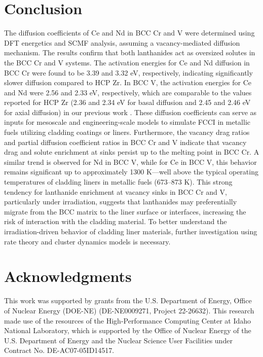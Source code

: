 \documentclass[preprint,12pt]{elsarticle}
\begin{document}
\section{Conclusion}
The diffusion coefficients of Ce and Nd in BCC Cr and V were determined using DFT energetics and SCMF analysis, assuming a vacancy-mediated diffusion mechanism. The results confirm that both lanthanides act as oversized solutes in the BCC Cr and V systems. The activation energies for Ce and Nd diffusion in BCC Cr were found to be 3.39 and 3.32 eV, respectively, indicating significantly slower diffusion compared to HCP Zr. In BCC V, the activation energies for Ce and Nd were 2.56 and 2.33 eV, respectively, which are comparable to the values reported for HCP Zr (2.36 and 2.34 eV for basal diffusion and 2.45 and 2.46 eV for axial diffusion) in our previous work \citep{shousha2024first}. These diffusion coefficients can serve as inputs for mesoscale and engineering-scale models to simulate FCCI in metallic fuels utilizing cladding coatings or liners. Furthermore, the vacancy drag ratios and partial diffusion coefficient ratios in BCC Cr and V indicate that vacancy drag and solute enrichment at sinks persist up to the melting point in BCC Cr. A similar trend is observed for Nd in BCC V, while for Ce in BCC V, this behavior remains significant up to approximately 1300 K—well above the typical operating temperatures of cladding liners in metallic fuels (673–873 K). This strong tendency for lanthanide enrichment at vacancy sinks in BCC Cr and V, particularly under irradiation, suggests that lanthanides may preferentially migrate from the BCC matrix to the liner surface or interfaces, increasing the risk of interaction with the cladding material. To better understand the irradiation-driven behavior of cladding liner materials, further investigation using rate theory and cluster dynamics models is necessary.

\FloatBarrier
\section{Acknowledgments}

This work was supported by grants from the U.S. Department of Energy, Office of Nuclear Energy (DOE-NE) (DE-NE0009271, Project 22-26632). This research made use of the resources of the High-Performance Computing Center at Idaho National Laboratory, which is supported by the Office of Nuclear Energy of the U.S. Department of Energy and the Nuclear Science User Facilities under Contract No. DE-AC07-05ID14517.
\end{document}
